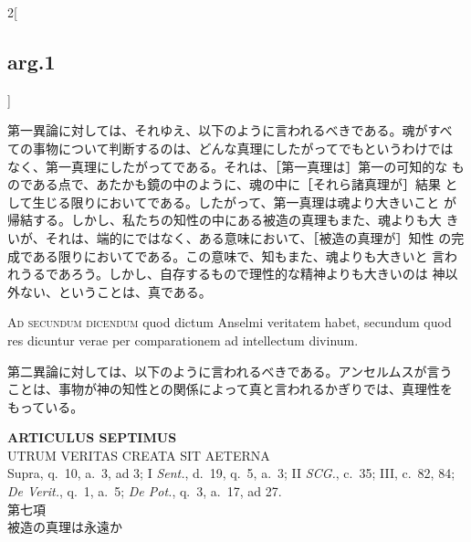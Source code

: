 \documentclass[paper=a4paper,fontsize=10pt,jafontsize=9pt,titlepage]{jlreq}
\begin{document}
\begin{paracol}{2}[\subsection{arg.1}]
\switchcolumn

第一異論に対しては、それゆえ、以下のように言われるべきである。魂がすべ
ての事物について判断するのは、どんな真理にしたがってでもというわけでは
なく、第一真理にしたがってである。それは、［第一真理は］第一の可知的な
ものである点で、あたかも鏡の中のように、魂の中に［それら諸真理が］結果
として生じる限りにおいてである。したがって、第一真理は魂より大きいこと
が帰結する。しかし、私たちの知性の中にある被造の真理もまた、魂よりも大
きいが、それは、端的にではなく、ある意味において、［被造の真理が］知性
の完成である限りにおいてである。この意味で、知もまた、魂よりも大きいと
言われうるであろう。しかし、自存するもので理性的な精神よりも大きいのは
神以外ない、ということは、真である。

\switchcolumn*[\subsection{ad.2}]


{\scshape Ad secundum dicendum} quod dictum Anselmi veritatem habet,
secundum quod res dicuntur verae per comparationem ad intellectum
divinum.

\switchcolumn

第二異論に対しては、以下のように言われるべきである。アンセルムスが言う
ことは、事物が神の知性との関係によって真と言われるかぎりでは、真理性を
もっている。

\end{paracol}
\newpage

{}
\setcounter{section}{7}
\setcounter{subsection}{0}
\begin{center}
 {\Large {\bfseries ARTICULUS SEPTIMUS}}\\
 {\large UTRUM VERITAS CREATA SIT AETERNA}\\
 {\footnotesize Supra, q.~10, a.~3, ad 3; I {\itshape Sent.}, d.~19,
 q.~5, a.~3; II {\itshape SCG.}, c.~35; III, c.~82, 84; {\itshape De
 Verit.}, q.~1, a.~5; {\itshape De Pot.}, q.~3, a.~17, ad 27.}\\
 {\Large 第七項\\被造の真理は永遠か}
\end{center}
\end{document}
